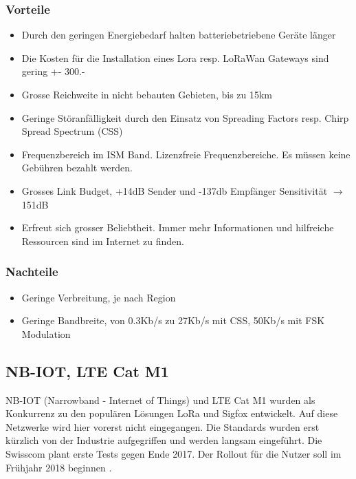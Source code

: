 \documentclass[11pt,english,german]{report}
\theoremstyle{definition}
\begin{document}
\subsubsection{Vorteile}
\begin{itemize}
	\item Durch den geringen Energiebedarf halten batteriebetriebene Geräte länger
	\item Die Kosten für die Installation eines Lora resp. LoRaWan Gateways sind gering +- 300.-
	\item Grosse Reichweite in nicht bebauten Gebieten, bis zu 15km
	\item Geringe Störanfälligkeit durch den Einsatz von Spreading Factors resp. Chirp Spread Spectrum (CSS)
	\item Frequenzbereich im ISM Band. Lizenzfreie Frequenzbereiche. Es müssen keine Gebühren bezahlt werden.
	\item Grosses Link Budget, +14dB Sender und -137db Empfänger Sensitivität $\rightarrow$ 151dB
	\item Erfreut sich grosser Beliebtheit. Immer mehr Informationen und hilfreiche Ressourcen sind im Internet zu finden.
\end{itemize}
\subsubsection{Nachteile}
\begin{itemize}
	\item Geringe Verbreitung, je nach Region
	\item Geringe Bandbreite, von 0.3Kb/s zu 27Kb/s mit CSS, 50Kb/s mit FSK Modulation \cite{loradatarate}
\end{itemize}

\newpage
\subsection{NB-IOT, LTE Cat M1}
NB-IOT (Narrowband - Internet of Things) und LTE Cat M1 wurden als Konkurrenz zu den populären Lösungen LoRa und Sigfox entwickelt. Auf diese Netzwerke wird hier vorerst nicht eingegangen. Die Standards wurden erst kürzlich von der Industrie aufgegriffen und werden langsam eingeführt. Die Swisscom plant erste Tests gegen Ende 2017. Der Rollout für die Nutzer soll im Frühjahr 2018 beginnen \cite{swisscomnbiot}.
\end{document}
